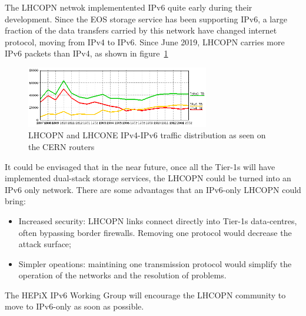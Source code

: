 
The LHCOPN netwok implementented IPv6 quite early during their development. 
Since the EOS storage service has been supporting IPv6, a large fraction of the data transfers carried by this network have changed internet  protocol, moving from IPv4 to IPv6. Since June 2019, LHCOPN carries more IPv6 packets than IPv4, as shown in figure~\ref{fig:lhcopne-traffic}

\begin{figure}[h]
\centering
\includegraphics[width=8cm]{lhcopne-traffic.png}
\caption{LHCOPN and LHCONE IPv4-IPv6 traffic distribution as seen on the CERN routers\cite{RefLHCOPNEv4v6}  }
\label{fig:lhcopne-traffic}
\end{figure}


It could be envisaged that in the near future, once all the Tier-1s will have implemented dual-stack storage services, the LHCOPN could be turned into an IPv6 only network. There are some advantages that an IPv6-only LHCOPN could bring:
\begin{itemize}
  \item Increased security: LHCOPN links connect directly into Tier-1s data-centres, often bypassing border firewalls. Removing one protocol would decrease the attack surface;
  \item Simpler opeations: maintining one transmission protocol would simplify the operation of the networks and the resolution of problems.
\end{itemize}

The HEPiX IPv6 Working Group will encourage the LHCOPN community to move to IPv6-only as soon as possible.




